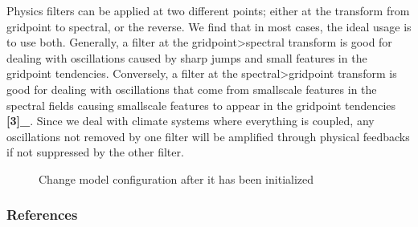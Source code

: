 \documentclass[letterpaper,10pt,english]{sphinxmanual}
\begin{document}
\begin{fulllineitems}
\begin{fulllineitems}
Physics filters can be applied at two different points; either at the transform from gridpoint
to spectral, or the reverse. We find that in most cases, the ideal usage is to use both.
Generally, a filter at the gridpoint\sphinxhyphen{}\textgreater{}spectral transform is good for dealing with oscillations
caused by sharp jumps and small features in the gridpoint tendencies. Conversely, a filter
at the spectral\sphinxhyphen{}\textgreater{}gridpoint transform is good for dealing with oscillations that come from
small\sphinxhyphen{}scale features in the spectral fields causing small\sphinxhyphen{}scale features to appear in the
gridpoint tendencies {\color{red}\bfseries{}{[}3{]}\_}. Since we deal with climate systems where everything is coupled,
any oscillations not removed by one filter will be amplified through physical feedbacks if not
suppressed by the other filter.



\begin{description}
\item[{}] \leavevmode
Change model configuration after it has been initialized

\end{description}


\subsubsection*{References}

\end{fulllineitems}


\end{fulllineitems}

\end{document}
